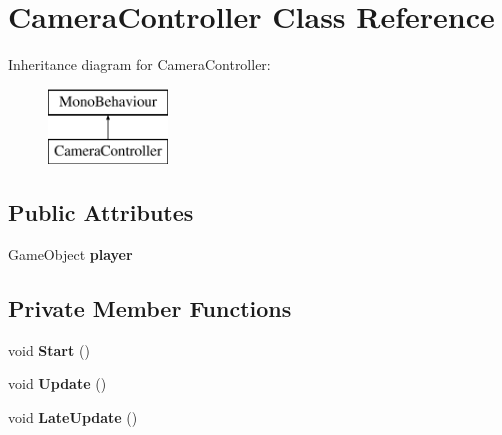 \hypertarget{class_camera_controller}{}\section{Camera\+Controller Class Reference}
\label{class_camera_controller}
Inheritance diagram for Camera\+Controller\+:\begin{figure}[H]
\begin{center}
\leavevmode
\includegraphics[height=2.000000cm]{class_camera_controller}
\end{center}
\end{figure}
\subsection*{Public Attributes}
\begin{DoxyCompactItemize}
\item 
\mbox{\label{class_camera_controller_aae794ec2d17947f671ce0eaef9aac8b7}} 
Game\+Object {\bfseries player}
\end{DoxyCompactItemize}
\subsection*{Private Member Functions}
\begin{DoxyCompactItemize}
\item 
\mbox{\label{class_camera_controller_ad4a238c6f7db3ee003302a245d860860}} 
void {\bfseries Start} ()
\item 
\mbox{\label{class_camera_controller_a7c4f486f4bcbd1d54a346fdce9707bd5}} 
void {\bfseries Update} ()
\item 
\mbox{\label{class_camera_controller_afcd241727886518c21b9609193e32d18}} 
void {\bfseries Late\+Update} ()
\end{DoxyCompactItemize}
